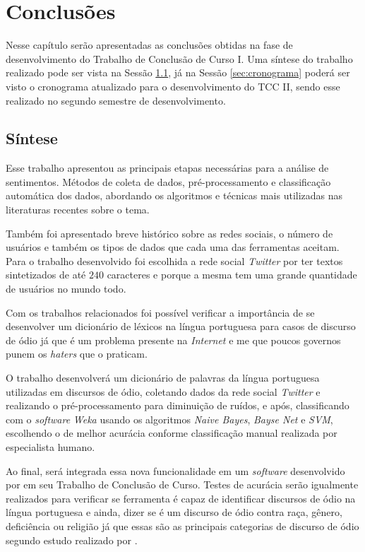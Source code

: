 \chapter{Conclusões}
\label{cap:conclusoes}
Nesse capítulo serão apresentadas as conclusões obtidas na fase de desenvolvimento do Trabalho de Conclusão de Curso I. Uma síntese do trabalho realizado pode ser vista na Sessão \ref{sec:sintese}, já na Sessão \ref{sec:cronograma} poderá ser visto o cronograma atualizado para o desenvolvimento do TCC II, sendo esse realizado no segundo semestre de desenvolvimento.

\section{Síntese}
\label{sec:sintese}

Esse trabalho apresentou as principais etapas necessárias para a análise de sentimentos. Métodos de coleta de dados, pré-processamento e classificação automática dos dados, abordando os algoritmos e técnicas mais utilizadas nas literaturas recentes sobre o tema.

Também foi apresentado breve histórico sobre as redes sociais, o número de usuários e também os tipos de dados que cada uma das ferramentas aceitam. Para o trabalho desenvolvido foi escolhida a rede social \textit{Twitter} por ter textos sintetizados de até $240$ caracteres e porque a mesma tem uma grande quantidade de usuários no mundo todo.

Com os trabalhos relacionados foi possível verificar a importância de se desenvolver um dicionário de léxicos na língua portuguesa para casos de discurso de ódio já que é um problema presente na \textit{Internet} e me que poucos governos punem os \textit{haters} que o praticam.

O trabalho desenvolverá um dicionário de palavras da língua portuguesa utilizadas em discursos de ódio, coletando dados da rede social \textit{Twitter} e realizando o pré-processamento para diminuição de ruídos, e após, classificando com o \textit{software} \textit{Weka} usando os algoritmos \textit{Naive Bayes}, \textit{Bayse Net} e \textit{SVM}, escolhendo o de melhor acurácia conforme classificação manual realizada por especialista humano.

Ao final, será integrada essa nova funcionalidade em um \textit{software} desenvolvido por  em seu Trabalho de Conclusão de Curso. Testes de acurácia serão igualmente realizados para verificar se ferramenta é capaz de identificar discursos de ódio na língua portuguesa e ainda, dizer se é um discurso de ódio contra raça, gênero, deficiência ou religião já que essas são as principais categorias de discurso de ódio segundo estudo realizado por .

